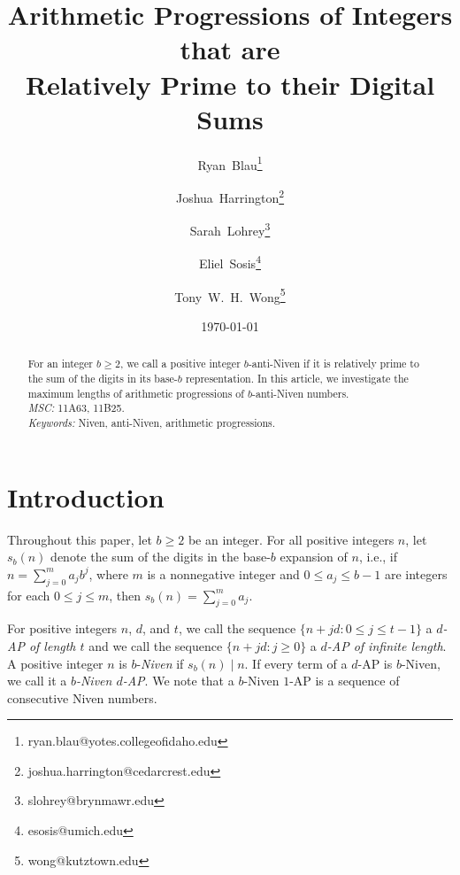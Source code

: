 \documentclass[12pt]{article}
\theoremstyle{definition}
\begin{document}
\title{Arithmetic Progressions of Integers that are\\Relatively Prime to their Digital Sums}
\author[1]{Ryan~Blau\thanks{ryan.blau@yotes.collegeofidaho.edu}}
\author[2]{Joshua~Harrington\thanks{joshua.harrington@cedarcrest.edu}}
\author[3]{Sarah~Lohrey\thanks{slohrey@brynmawr.edu}}
\author[4]{Eliel~Sosis\thanks{esosis@umich.edu}}
\author[5]{Tony~W.~H.~Wong\thanks{wong@kutztown.edu}}
\date{\today}

\maketitle

\begin{abstract}

For an integer $b\geq 2$, we call a positive integer $b$-anti-Niven if it is relatively prime to the sum of the digits in its base-$b$ representation.  In this article, we investigate the maximum lengths of arithmetic progressions of $b$-anti-Niven numbers.\\
\textit{MSC:} 11A63, 11B25.\\
\textit{Keywords:} Niven, anti-Niven, arithmetic progressions.
\end{abstract}

\section{Introduction}

Throughout this paper, let $b\geq2$ be an integer. For all positive integers $n$, let $s_b(n)$ denote the sum of the digits in the base-$b$ expansion of $n$, i.e., if $n=\sum_{j=0}^m a_j b^j$, where $m$ is a nonnegative integer and $0\leq a_j \leq b-1$ are integers for each $0\leq j\leq m$, then $s_b(n)=\sum_{j=0}^m a_j$.

For positive integers $n$, $d$, and $t$, we call the sequence $\{n+jd:0\leq j\leq t-1\}$ a \emph{$d$-AP of length $t$} and we call the sequence $\{n+jd:j\geq 0\}$ a \emph{$d$-AP of infinite length}. A positive integer $n$ is $b$-\emph{Niven} if $s_b(n)\mid n$.  If every term of a $d$-AP is $b$-Niven, we call it a \emph{$b$-Niven $d$-AP}.  We note that a $b$-Niven $1$-AP is a sequence of consecutive Niven numbers.  
\end{document}
